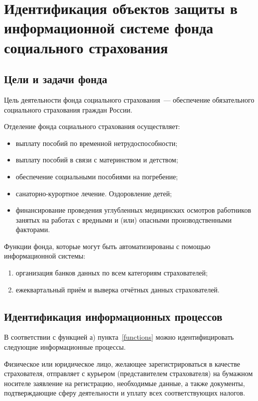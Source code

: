 \section{Идентификация объектов защиты в
  информационной системе фонда
  социального страхования}

\subsection{Цели и задачи фонда}

\point Цель деятельности фонда социального страхования~--- обеспечение
обязательного социального страхования граждан России.

\point Отделение фонда социального страхования осуществляет:

\begin{itemize}
\item выплату пособий по временной нетрудоспособности;
\item выплату пособий в связи с материнством и детством;
\item обеспечение социальными пособиями на погребение;
\item санаторно-курортное лечение. Оздоровление детей;
\item финансирование проведения углубленных медицинских осмотров
  работников занятых на работах с вредными и (или) опасными
  производственными факторами.
\end{itemize}

\point Функции фонда, которые могут быть автоматизированы с помощью
информационной системы: \label{functions}

\begin{enumerate}
\item организация банков данных по всем категориям страхователей;
\item ежеквартальный приём и выверка отчётных данных страхователей.
\end{enumerate}

\subsection{Идентификация информационных процессов}

В соответствии с функцией а) пункта~\ref{functions} можно
идентифицировать следующие информационные процессы.

\point Физическое или юридическое лицо, желающее зарегистрироваться в
качестве страхователя, отправляет с курьером (представителем
страхователя) на бумажном носителе заявление на регистрацию,
необходимые данные, а также документы, подтверждающие сферу
деятельности и уплату всех соответствующих налогов.

